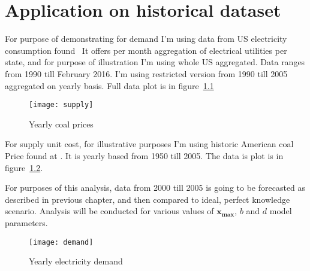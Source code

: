 
\chapter{Application on historical dataset}
\label{chap:Application on historical dataset}

For purpose of demonstrating for demand I'm using data from US electricity consumption found~\autocite{us-elec} It offers per month aggregation of electrical utilities per state, and for purpose of illustration I'm using whole US aggregated. Data ranges from 1990 till February 2016. I'm using restricted version from 1990 till 2005 aggregated on yearly basis. Full data plot is in figure~\ref{fig:supply}

\begin{figure}[]
  \centering
  \texttt{[image: supply]}
  \caption{Yearly coal prices}
  \label{fig:supply}
\end{figure}

For supply unit cost, for illustrative purposes I'm using historic American coal Price found at \autocite{us-coal}. It is yearly based from 1950 till 2005. The data is plot is in figure~\ref{fig:demand}.

For purposes of this analysis, data from 2000 till 2005 is going to be forecasted as described in previous chapter, and then compared to ideal, perfect knowledge scenario. Analysis will be conducted for various values of $\mathbf{x_{\max}}$, $b$ and $d$ model parameters.

\begin{figure}[]
  \centering
  \texttt{[image: demand]}
  \caption{Yearly electricity demand}
  \label{fig:demand}
\end{figure}
